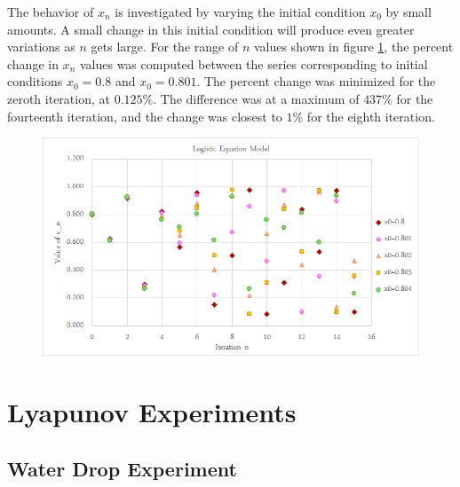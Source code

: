 \documentclass[a4paper]{article}
\begin{document}
The behavior of $x_n$ is investigated by varying the initial condition $x_0$ by small amounts. A small change in this initial condition will produce even greater variations as $n$ gets large. For the range of $n$ values shown in figure \ref{varyx0}, the percent change in $x_n$ values was computed between the series corresponding to initial conditions $x_0=0.8$ and $x_0=0.801$. The percent change was minimized for the zeroth iteration, at $0.125\%$. The difference was at a maximum of $437\%$ for the fourteenth iteration, and the change was closest to $1\%$ for the eighth iteration.

\begin{figure}[H]
\centering
\includegraphics[width=1\textwidth]{varyx0.png}
\label{varyx0}
\end{figure}

\section{Lyapunov Experiments}

\subsection{Water Drop Experiment}
\end{document}
